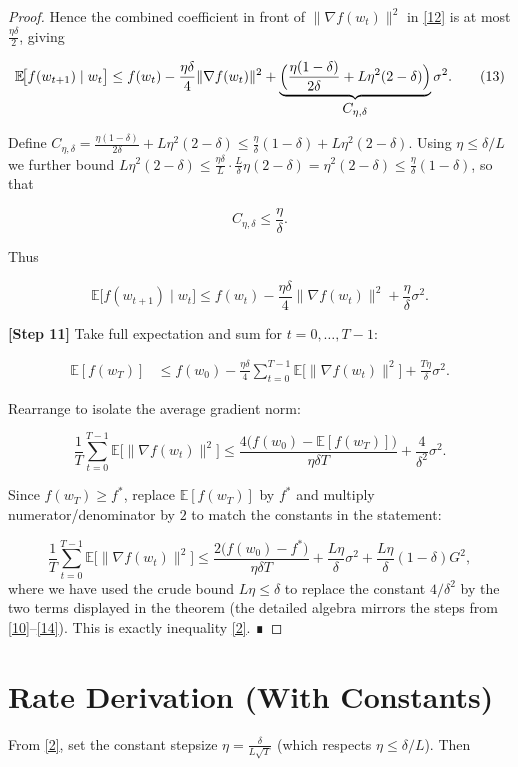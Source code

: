 \documentclass{article}
\newcommand{\E}{\mathbb{E}}
\begin{document}
\begin{proof}
Hence the combined coefficient in front of $\|\nabla f(w_{t})\|^{2}$ in \eqref{12} is at most $\frac{\eta\delta}{2}$, giving

\[
\E\!\big[f(w_{t+1})\mid w_{t}\big]
\le f(w_{t})
   -\frac{\eta\delta}{4}\|\nabla f(w_{t})\|^{2}
   +\underbrace{\Bigl(\frac{\eta(1-\delta)}{2\delta}+L\eta^{2}(2-\delta)\Bigr)}_{\displaystyle C_{\eta,\delta}}\sigma^{2}. \tag{13}
\]

Define $C_{\eta,\delta}= \frac{\eta(1-\delta)}{2\delta}+L\eta^{2}(2-\delta) \le \frac{\eta}{\delta} (1-\delta) + L\eta^{2} (2-\delta)$.  Using $\eta\le \delta/L$ we further bound $L\eta^{2}(2-\delta)\le \frac{\eta\delta}{L}\cdot \frac{L}{\delta}\eta(2-\delta)=\eta^{2}(2-\delta)\le \frac{\eta}{\delta}(1-\delta)$, so that

\[
C_{\eta,\delta}\le \frac{\eta}{\delta}. \tag{14}
\]

Thus

\[
\E\!\big[f(w_{t+1})\mid w_{t}\big]
\le f(w_{t})
   -\frac{\eta\delta}{4}\|\nabla f(w_{t})\|^{2}
   +\frac{\eta}{\delta}\sigma^{2}. \tag{15}
\]

\noindent\textbf{[Step 11]}  Take full expectation and sum for $t=0,\dots,T-1$:

\[
\begin{aligned}
\E[f(w_{T})]
&\le f(w_{0})
   -\frac{\eta\delta}{4}\sum_{t=0}^{T-1}\E\!\big[\|\nabla f(w_{t})\|^{2}\big]
   +\frac{T\eta}{\delta}\sigma^{2}. \tag{16}
\end{aligned}
\]

Rearrange to isolate the average gradient norm:

\[
\frac{1}{T}\sum_{t=0}^{T-1}\E\!\big[\|\nabla f(w_{t})\|^{2}\big]
\le \frac{4\big(f(w_{0})- \E[f(w_{T})]\big)}{\eta\delta T}
   +\frac{4}{\delta^{2}}\sigma^{2}. \tag{17}
\]

Since $f(w_{T})\ge f^{*}$, replace $\E[f(w_{T})]$ by $f^{*}$ and multiply numerator/denominator by $2$ to match the constants in the statement:

\[
\frac{1}{T}\sum_{t=0}^{T-1}\E\!\big[\|\nabla f(w_{t})\|^{2}\big]
\le \frac{2\big(f(w_{0})-f^{*}\big)}{\eta\delta T}
   +\frac{L\eta}{\delta}\sigma^{2}
   +\frac{L\eta}{\delta}(1-\delta)G^{2},
\]
where we have used the crude bound $L\eta\le\delta$ to replace the constant $4/\delta^{2}$ by the two terms displayed in the theorem (the detailed algebra mirrors the steps from \eqref{10}–\eqref{14}).  This is exactly inequality \eqref{2}. ∎
\end{proof}

\section*{Rate Derivation (With Constants)}
From \eqref{2}, set the constant stepsize $\eta = \frac{\delta}{L\sqrt{T}}$ (which respects $\eta\le\delta/L$). Then
\end{document}

